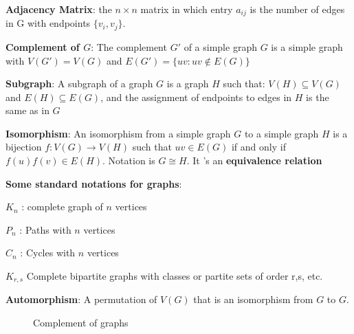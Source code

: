 \documentclass{article}
\theoremstyle{definition}
\theoremstyle{definition}
\theoremstyle{named}
\begin{document}
\begin{compactitem}
    
    \item \textbf{Adjacency Matrix}: the
$n \times n$ matrix in which entry $a_{ij}$ is the number
of edges in G with endpoints $\{v_i, v_j\}$.

    \item \textbf{Complement of $G$}: The complement $G'$ of a
simple graph $G$ is a simple graph with $V(G') = V(G)$ and  $E(G') = \{ uv : uv \notin E(G) \}$
    
    \item \textbf{Subgraph}: A subgraph of a graph $G$ is a graph $H$ such that:
$V(H) \subseteq V(G)$ and $E(H) \subseteq E(G)$, and the assignment of endpoints to edges in $H$ is the same as in $G$

    \item \textbf{Isomorphism}: An isomorphism from a simple graph $G$ to a
simple graph $H$ is a bijection $f:V(G) \rightarrow V(H)$ such
that $uv \in E(G)$ if and only if $f(u)f(v) \in E(H)$. Notation is $G \cong H$. It
's an \textbf{equivalence relation}
    \item \textbf{Some standard notations for graphs}:
    \begin{compactitem}
        \item $K_n$ : complete graph of $n$ vertices
        \item $P_n$ : Paths with $n$ vertices
        \item $C_n$ : Cycles with $n$ vertices
        \item $K_{r,s}$ Complete bipartite graphs with classes or partite
sets of order r,s, etc.
    
    \end{compactitem}
    \item \textbf{Automorphism}: A permutation of
$V(G)$ that is an isomorphism from $G$ to $G$.
\end{compactitem}



\begin{figure}
    \centering

\caption{Complement of graphs}
 \label{Complement of graphs}

\end{figure}
\end{document}

